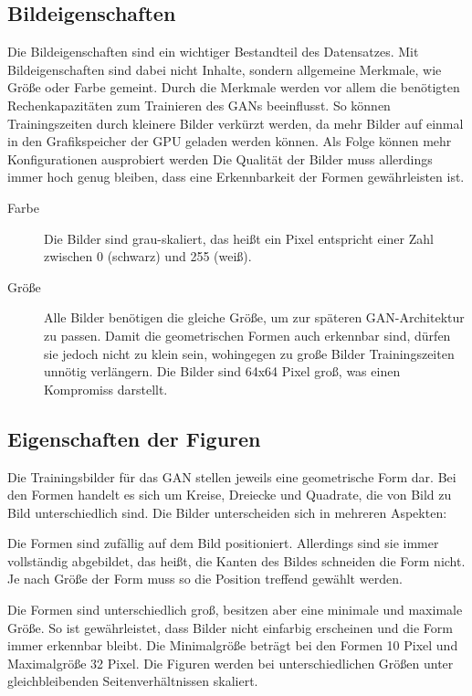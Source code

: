 \subsection{Bildeigenschaften}
Die Bildeigenschaften sind ein wichtiger Bestandteil des Datensatzes.
Mit Bildeigenschaften sind dabei nicht Inhalte, sondern allgemeine Merkmale, wie Größe oder Farbe gemeint.
Durch die Merkmale werden vor allem die benötigten Rechenkapazitäten zum Trainieren des GANs beeinflusst.
So können Trainingszeiten durch kleinere Bilder verkürzt werden, da mehr Bilder auf einmal in den Grafikspeicher der GPU geladen werden können.
Als Folge können mehr Konfigurationen ausprobiert werden
Die Qualität der Bilder muss allerdings immer hoch genug bleiben, dass eine Erkennbarkeit der Formen gewährleisten ist.

\begin{description}
	\item[Farbe]
	Die Bilder sind grau-skaliert, das heißt ein Pixel entspricht einer Zahl zwischen 0 (schwarz) und 255 (weiß).
	
	\item[Größe]
	Alle Bilder benötigen die gleiche Größe, um zur späteren GAN-Architektur zu passen.
	Damit die geometrischen Formen auch erkennbar sind, dürfen sie jedoch nicht zu klein sein, wohingegen zu große Bilder Trainingszeiten unnötig verlängern.
	Die Bilder sind 64x64 Pixel groß, was einen Kompromiss darstellt.
\end{description}

\subsection{Eigenschaften der Figuren}
Die Trainingsbilder für das GAN stellen jeweils eine geometrische Form dar.
Bei den Formen handelt es sich um Kreise, Dreiecke und Quadrate, die von Bild zu Bild unterschiedlich sind.
Die Bilder unterscheiden sich in mehreren Aspekten:
\begin{description}[style=nextline]
	\item[Position]
	Die Formen sind zufällig auf dem Bild positioniert.
	Allerdings sind sie immer vollständig abgebildet, das heißt, die Kanten des Bildes schneiden die Form nicht.
	Je nach Größe der Form muss so die Position treffend gewählt werden.
	
	\item[Größe und Form]
	Die Formen sind unterschiedlich groß, besitzen aber eine minimale und maximale Größe.
	So ist gewährleistet, dass Bilder nicht einfarbig erscheinen und die Form immer erkennbar bleibt.
	Die Minimalgröße beträgt bei den Formen 10 Pixel und Maximalgröße 32 Pixel.
	Die Figuren werden bei unterschiedlichen Größen unter gleichbleibenden Seitenverhältnissen skaliert.
\end{description}


